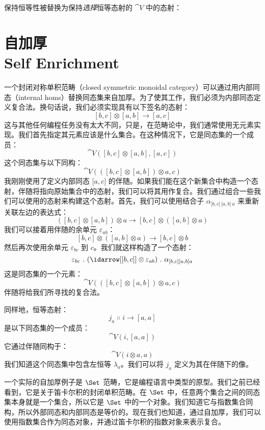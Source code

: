 \noindent
保持恒等性被替换为保持\emph{选择}恒等态射的 $\cat{V}$ 中的态射：

\begin{figure}[H]
  \centering
\end{figure}

\section{自加厚\\ \textmd{Self Enrichment}}

一个封闭对称单积范畴（closed symmetric monoidal category）可以通过用内部同态（internal homs）替换同态集来自加厚。为了使其工作，我们必须为内部同态定义复合法。换句话说，我们必须实现具有以下签名的态射：
\[[b, c] \otimes [a, b] \to [a, c]\]
这与其他任何编程任务没有太大不同，只是，在范畴论中，我们通常使用无元素实现。我们首先指定其元素应该是什么集合。在这种情况下，它是同态集的一个成员：
\[\cat{V}([b, c] \otimes [a, b], [a, c])\]
这个同态集与以下同构：
\[\cat{V}(([b, c] \otimes [a, b]) \otimes a, c)\]
我刚刚使用了定义内部同态 ${[}a, c{]}$ 的伴随。如果我们能在这个新集合中构造一个态射，伴随将指向原始集合中的态射，我们可以将其用作复合。我们通过组合一些我们可以使用的态射来构建这个态射。首先，我们可以使用结合子 $\alpha_{{[}b, c{]}\ {[}a, b{]}\ a}$ 来重新关联左边的表达式：
\[([b, c] \otimes [a, b]) \otimes a \to [b, c] \otimes ([a, b] \otimes a)\]
我们可以接着用伴随的余单元 $\varepsilon_{a b}$：
\[[b, c] \otimes ([a, b] \otimes a) \to [b, c] \otimes b\]
然后再次使用余单元 $\varepsilon_{b c}$ 到 $c$。我们就这样构造了一个态射：
\[\varepsilon_{b c}\ .\ (\idarrow[{[b, c]}] \otimes \varepsilon_{a b})\ .\ \alpha_{[b, c] [a, b] a}\]
这是同态集的一个元素：
\[\cat{V}(([b, c] \otimes [a, b]) \otimes a, c)\]
伴随将给我们所寻找的复合法。

同样地，恒等态射：
\[j_a \Colon i \to [a, a]\]
是以下同态集的一个成员：
\[\cat{V}(i, [a, a])\]
它通过伴随同构于：
\[\cat{V}(i \otimes a, a)\]
我们知道这个同态集中包含左恒等 $\lambda_a$。我们可以将 $j_a$ 定义为其在伴随下的像。

一个实际的自加厚例子是 $\Set$ 范畴，它是编程语言中类型的原型。我们之前已经看到，它是关于笛卡尔积的封闭单积范畴。在 $\Set$ 中，任意两个集合之间的同态集本身就是一个集合，所以它是 $\Set$ 中的一个对象。我们知道它与指数集合同构，所以外部同态和内部同态是等价的。现在我们也知道，通过自加厚，我们可以使用指数集合作为同态对象，并通过笛卡尔积的指数对象来表示复合。

